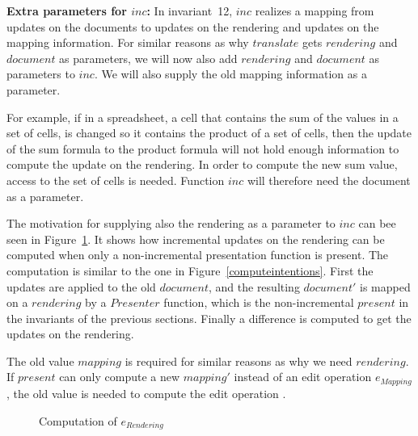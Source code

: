 \documentclass[twoside,epsf]{report}
\begin{document}
{\bf }{\bf Extra parameters for $inc$: }In invariant~12, $inc$ realizes a mapping from updates on the documents to updates on the rendering and updates on the mapping information. For similar reasons as why $translate$ gets $rendering$ and $document$ as parameters, we will now also add $rendering$ and $document$ as parameters to $inc$. We will also supply the old mapping information as a parameter.

For example, if in a spreadsheet, a cell that contains the sum of the values in a set of cells, is changed so it contains the product of a set of cells, then the update of the sum formula to the product formula will not hold enough information to compute the update on the rendering. In order to compute the new sum value, access to the set of cells is needed. Function $inc$ will therefore need the document as a parameter. 

The motivation for supplying also the rendering as a parameter to $inc$ can bee seen in Figure~\ref{computeops}. It shows how incremental updates on the rendering can be computed when only a non-incremental presentation function is present. The computation is similar to the one in Figure~\ref{computeintentions}. First the updates are applied to the old $document$, and the resulting $document'$ is mapped on a $rendering$ by a $Presenter$ function, which is the non-incremental $present$ in the invariants of the previous sections. Finally a difference is computed to get the updates on the rendering.

The old value $mapping$ is required for similar reasons as why we need $rendering$. If $present$ can only compute a new $mapping'$ instead of an edit operation $e_{Mapping}$, the old value is needed to compute the edit operation . 
\begin{figure}
\begin{small}
\begin{center}
\begin{center}
\begin{small}
\bigskip \noindent
{}
\end{small}
\end{center}\caption{Computation of $e_{Rendering}$ }\label{computeops} 
\end{center}
\end{small}
\end{figure}
\end{document}
